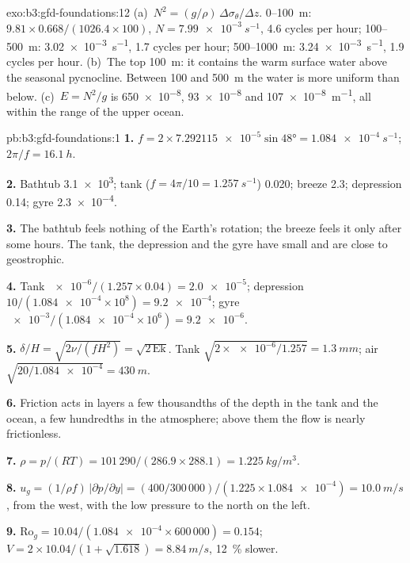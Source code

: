 \begin{solution}{exo:b3:gfd-foundations:12}
(a)~$N^2 = (g/\rho)\,\Delta\sigma_\theta/\Delta z$. 0--\qty{100}{m}:
$9.81\times0.668/(1026.4\times100)$, $N = \qty{7.99e-3}{s^{-1}}$, 4.6
cycles per hour; 100--\qty{500}{m}: \qty{3.02e-3}{s^{-1}}, 1.7 cycles per
hour; 500--\qty{1000}{m}: \qty{3.24e-3}{s^{-1}}, 1.9 cycles per hour.
(b)~The top \qty{100}{m}: it contains the warm surface water above the
seasonal pycnocline. Between 100 and \qty{500}{m} the water is more
uniform than below. (c)~$E = N^2/g$ is \num{650e-8}, \num{93e-8} and
\qty{107e-8}{m^{-1}}, all within the range of the upper ocean.
\end{solution}

\begin{solution}{pb:b3:gfd-foundations:1}
\textbf{1.} $f = 2\times\num{7.292115e-5}\sin\ang{48} =
\qty{1.084e-4}{s^{-1}}$; $2\pi/f = \qty{16.1}{h}$.

\textbf{2.} Bathtub \num{3.1e3}; tank ($f = 4\pi/10 = \qty{1.257}{s^{-1}}$)
0.020; breeze 2.3; depression 0.14; gyre \num{2.3e-4}.

\textbf{3.} The bathtub feels nothing of the Earth's rotation; the breeze
feels it only after some hours. The tank, the depression and the gyre have
small  and are close to geostrophic.

\textbf{4.} Tank $\num{e-6}/(1.257\times0.04) = \num{2.0e-5}$; depression
$10/(\num{1.084e-4}\times10^8) = \num{9.2e-4}$; gyre
$\num{e-3}/(\num{1.084e-4}\times10^6) = \num{9.2e-6}$.

\textbf{5.} $\delta/H = \sqrt{2\nu/(fH^2)} = \sqrt{2\,\mathrm{Ek}}$. Tank
$\sqrt{2\times\num{e-6}/1.257} = \qty{1.3}{mm}$; air $\sqrt{20/\num{1.084e-4}}
= \qty{430}{m}$.

\textbf{6.} Friction acts in layers a few thousandths of the depth in the
tank and the ocean, a few hundredths in the atmosphere; above them the flow
is nearly frictionless.

\textbf{7.} $\rho = p/(RT) = 101\,290/(286.9\times288.1) =
\qty{1.225}{kg/m^3}$.

\textbf{8.} $u_g = (1/\rho f)\,|\partial p/\partial y| = (400/300\,000)/(1.225
\times\num{1.084e-4}) = \qty{10.0}{m/s}$, from the west, with the low
pressure to the north on the left.

\textbf{9.} $\mathrm{Ro}_g = 10.04/(\num{1.084e-4}\times600\,000) = 0.154$;
$V = 2\times10.04/(1 + \sqrt{1.618}) = \qty{8.84}{m/s}$, \qty{12}{\percent}
slower.


\end{solution}
